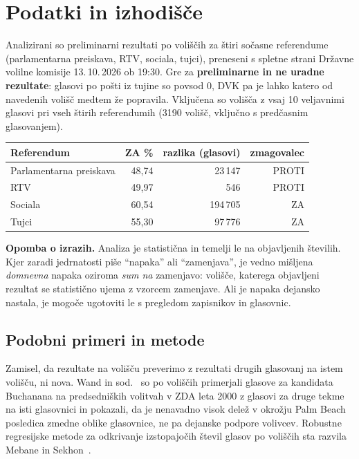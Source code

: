 \documentclass[11pt,a4paper]{article}
\begin{document}
\section{Podatki in izhodišče}

Analizirani so preliminarni rezultati po voliščih za štiri sočasne referendume (parlamentarna preiskava, RTV, sociala, tujci), preneseni s spletne strani Državne volilne komisije 13.\,10.\,2026 ob 19:30. Gre za \textbf{preliminarne in ne uradne rezultate}: glasovi po pošti iz tujine so povsod 0, DVK pa je lahko katero od navedenih volišč medtem že popravila. Vključena so volišča z vsaj 10 veljavnimi glasovi pri vseh štirih referendumih (3190 volišč, vključno s predčasnim glasovanjem).

\begin{center}
\small\begin{tabular}{lrrr}
\toprule
Referendum & ZA \% & razlika (glasovi) & zmagovalec \\
\midrule
Parlamentarna preiskava & 48,74 & 23\,147 & PROTI \\
RTV & 49,97 & 546 & PROTI \\
Sociala & 60,54 & 194\,705 & ZA \\
Tujci & 55,30 & 97\,776 & ZA \\
\bottomrule
\end{tabular}
\end{center}

\textbf{Opomba o izrazih.} Analiza je statistična in temelji le na objavljenih številih. Kjer zaradi jedrnatosti piše ``napaka'' ali ``zamenjava'', je vedno mišljena \emph{domnevna} napaka oziroma \emph{sum na} zamenjavo: volišče, katerega objavljeni rezultat se statistično ujema z vzorcem zamenjave. Ali je napaka dejansko nastala, je mogoče ugotoviti le s pregledom zapisnikov in glasovnic.

\subsection{Podobni primeri in metode}

Zamisel, da rezultate na volišču preverimo z rezultati drugih glasovanj na istem volišču, ni nova. Wand in sod.~\cite{wand2001} so po voliščih primerjali glasove za kandidata Buchanana na predsedniških volitvah v ZDA leta 2000 z glasovi za druge tekme na isti glasovnici in pokazali, da je nenavadno visok delež v okrožju Palm Beach posledica zmedne oblike glasovnice, ne pa dejanske podpore volivcev. Robustne regresijske metode za odkrivanje izstopajočih števil glasov po voliščih sta razvila Mebane in Sekhon~\cite{mebane2004}.
\end{document}
